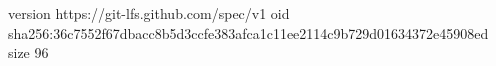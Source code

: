 version https://git-lfs.github.com/spec/v1
oid sha256:36c7552f67dbacc8b5d3ccfe383afca1c11ee2114c9b729d01634372e45908ed
size 96
